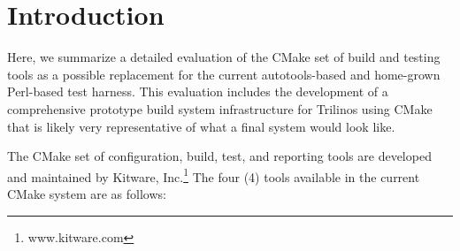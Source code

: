 \documentclass[pdf,ps2pdf,11pt]{SANDreport}
\begin{document}


%
\setcounter{secnumdepth}{3}
\SANDmain %


%
\section{Introduction}
%

Here, we summarize a detailed evaluation of the CMake set of build and
testing tools as a possible replacement for the current
autotools-based and home-grown Perl-based test harness.  This
evaluation includes the development of a comprehensive prototype build
system infrastructure for Trilinos using CMake that is likely very
representative of what a final system would look like.

The CMake set of configuration, build, test, and reporting tools are
developed and maintained by Kitware,
Inc.\footnote{www.kitware.com} The four (4) tools available in the
current CMake system are as follows:
\end{document}
